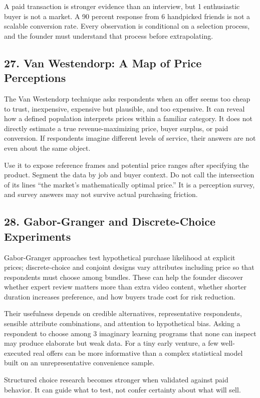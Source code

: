 A paid transaction is stronger evidence than an interview, but 1 enthusiastic buyer is not a market. A 90 percent response from 6 handpicked friends is not a scalable conversion rate. Every observation is conditional on a selection process, and the founder must understand that process before extrapolating.

\subsection*{27. Van Westendorp: A Map of Price Perceptions}

The Van Westendorp technique asks respondents when an offer seems too cheap to trust, inexpensive, expensive but plausible, and too expensive. It can reveal how a defined population interprets prices within a familiar category. It does not directly estimate a true revenue-maximizing price, buyer surplus, or paid conversion. If respondents imagine different levels of service, their answers are not even about the same object.

Use it to expose reference frames and potential price ranges after specifying the product. Segment the data by job and buyer context. Do not call the intersection of its lines ``the market's mathematically optimal price.'' It is a perception survey, and survey answers may not survive actual purchasing friction.

\subsection*{28. Gabor-Granger and Discrete-Choice Experiments}

Gabor-Granger approaches test hypothetical purchase likelihood at explicit prices; discrete-choice and conjoint designs vary attributes including price so that respondents must choose among bundles. These can help the founder discover whether expert review matters more than extra video content, whether shorter duration increases preference, and how buyers trade cost for risk reduction.

Their usefulness depends on credible alternatives, representative respondents, sensible attribute combinations, and attention to hypothetical bias. Asking a respondent to choose among 3 imaginary learning programs that none can inspect may produce elaborate but weak data. For a tiny early venture, a few well-executed real offers can be more informative than a complex statistical model built on an unrepresentative convenience sample.

Structured choice research becomes stronger when validated against paid behavior. It can guide what to test, not confer certainty about what will sell.

